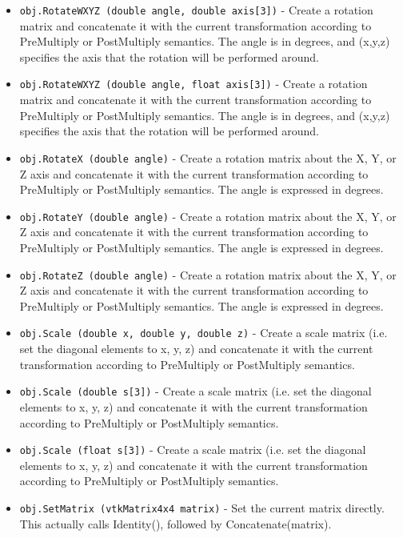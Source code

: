 \begin{itemize}
\item  \verb|obj.RotateWXYZ (double angle, double axis[3])| -  Create a rotation matrix and concatenate it with the current
 transformation according to PreMultiply or PostMultiply semantics.
 The angle is in degrees, and (x,y,z) specifies the axis that the
 rotation will be performed around. 

\item  \verb|obj.RotateWXYZ (double angle, float axis[3])| -  Create a rotation matrix and concatenate it with the current
 transformation according to PreMultiply or PostMultiply semantics.
 The angle is in degrees, and (x,y,z) specifies the axis that the
 rotation will be performed around. 

\item  \verb|obj.RotateX (double angle)| -  Create a rotation matrix about the X, Y, or Z axis and concatenate
 it with the current transformation according to PreMultiply or
 PostMultiply semantics.  The angle is expressed in degrees.

\item  \verb|obj.RotateY (double angle)| -  Create a rotation matrix about the X, Y, or Z axis and concatenate
 it with the current transformation according to PreMultiply or
 PostMultiply semantics.  The angle is expressed in degrees.

\item  \verb|obj.RotateZ (double angle)| -  Create a rotation matrix about the X, Y, or Z axis and concatenate
 it with the current transformation according to PreMultiply or
 PostMultiply semantics.  The angle is expressed in degrees.

\item  \verb|obj.Scale (double x, double y, double z)| -  Create a scale matrix (i.e. set the diagonal elements to x, y, z)
 and concatenate it with the current transformation according to
 PreMultiply or PostMultiply semantics.

\item  \verb|obj.Scale (double s[3])| -  Create a scale matrix (i.e. set the diagonal elements to x, y, z)
 and concatenate it with the current transformation according to
 PreMultiply or PostMultiply semantics.

\item  \verb|obj.Scale (float s[3])| -  Create a scale matrix (i.e. set the diagonal elements to x, y, z)
 and concatenate it with the current transformation according to
 PreMultiply or PostMultiply semantics.

\item  \verb|obj.SetMatrix (vtkMatrix4x4 matrix)| -  Set the current matrix directly.  This actually calls Identity(),
 followed by Concatenate(matrix).


\end{itemize}
